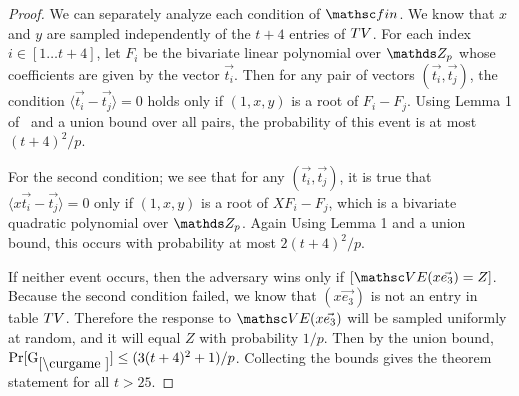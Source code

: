 \begin{proof}
We can separately analyze each condition of $\Finalize$. We know that $x$ and $y$ are sampled independently of the $t + 4$ entries of $TV$. For each index $i \in [1\ldots t+4]$, let $F_i$ be the bivariate linear polynomial over $\ZZ_p$ whose coefficients are given by the vector $\vec{t_i}$. Then for any pair  of vectors $(\vec{t_i}, \vec{t_j})$, the condition $\langle \vec{t_i} - \vec{t_j} \rangle = 0$ holds only if $(1,x,y)$ is a root of $F_i-F_j$. Using Lemma 1 of~\cite{EC:Shoup97} and a union bound over all pairs, the probability of this event is at most $(t+4)^2/p$. 

For the second condition; we see that for any $(\vec{t_i}, \vec{t_j})$, it is true that $\langle x \vec{t_i} - \vec{t_j} \rangle = 0$ only if $(1,x,y)$ is a root of $XF_i - F_j$, which is a bivariate quadratic polynomial over $\ZZ_p$. Again Using Lemma 1 and a union bound, this occurs with probability at most $2(t+4)^2/p$.

If neither event occurs, then the adversary wins only if $[\VE(x\vec{e_3}) = Z]$. Because the second condition failed, we know that $(x\vec{e_3})$ is not an entry in table $TV$. Therefore the response to $\VE(x \vec{e_3})$ will be sampled uniformly at random, and it will equal $Z$ with probability $1/p$.
Then by the union bound, $\Pr[\curGm*] \leq (3(t+4)^2+1)/p$. Collecting the bounds gives the theorem statement for all $t >25$.
\end{proof}
